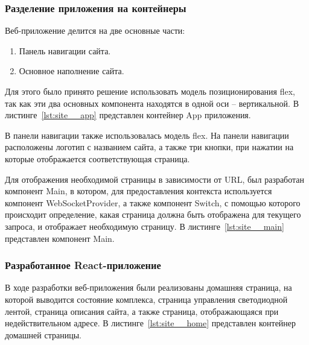 \subsubsection{Разделение приложения на контейнеры}

Веб-приложение делится на две основные части:

\begin{enumerate}
  \item Панель навигации сайта.
  \item Основное наполнение сайта.
\end{enumerate}

Для этого было принято решение использовать модель позиционирования flex, так как эти два основных компонента находятся в одной оси -- вертикальной. В листинге~\ref{lst:site__app} представлен контейнер App приложения.



В панели навигации также использовалась модель flex. На панели навигации расположены логотип с названием сайта, а также три кнопки, при нажатии на которые отображается соответствующая страница.

Для отображения необходимой страницы в зависимости от URL, был разработан компонент Main, в котором, для предоставления контекста используется компонент WebSocketProvider, а также компонент Switch, с помощью которого происходит определение, какая страница должна быть отображена для текущего запроса, и отображает необходимую страницу. В листинге~\ref{lst:site__main} представлен компонент Main.



\subsubsection{Разработанное React-приложение}

В ходе разработки веб-приложения были реализованы домашняя страница, на которой выводится состояние комплекса, страница управления светодиодной лентой, страница описания сайта, а также страница, отображающаяся при недействительном адресе. В листинге~\ref{lst:site__home} представлен контейнер домашней страницы.



